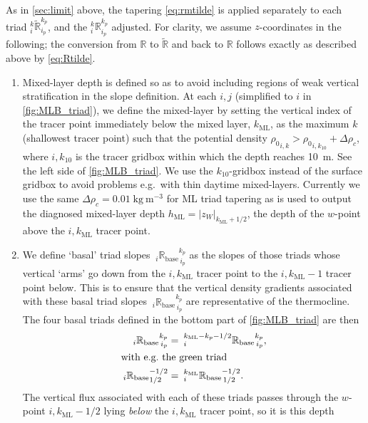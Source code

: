 \documentclass[../tex_main/NEMO_manual]{subfiles}
\begin{document}
As in \autoref{sec:limit} above, the tapering \autoref{eq:rmtilde} is applied separately to
each triad $_i^k\tilde{\mathbb{R}}_{i_p}^{k_p}$, and the $_i^k\mathbb{R}_{i_p}^{k_p}$ adjusted.
For clarity, we assume $z$-coordinates in the following;
the conversion from $\mathbb{R}$ to $\tilde{\mathbb{R}}$ and back to $\mathbb{R}$ follows exactly as
described above by \autoref{eq:Rtilde}.
\begin{enumerate}
\item
  Mixed-layer depth is defined so as to avoid including regions of weak vertical stratification in
  the slope definition.
  At each $i,j$ (simplified to $i$ in \autoref{fig:MLB_triad}),
  we define the mixed-layer by setting the vertical index of the tracer point immediately below the mixed layer,
  $k_{\mathrm{ML}}$, as the maximum $k$ (shallowest tracer point) such that
  the potential density ${\rho_0}_{i,k}>{\rho_0}_{i,k_{10}}+\Delta\rho_c$,
  where $i,k_{10}$ is the tracer gridbox within which the depth reaches 10~m.
  See the left side of \autoref{fig:MLB_triad}.
  We use the $k_{10}$-gridbox instead of the surface gridbox to avoid problems e.g.\ with thin daytime mixed-layers.
  Currently we use the same $\Delta\rho_c=0.01\;\mathrm{kg\:m^{-3}}$ for ML triad tapering as is used to
  output the diagnosed mixed-layer depth $h_{\mathrm{ML}}=|z_{W}|_{k_{\mathrm{ML}}+1/2}$,
  the depth of the $w$-point above the $i,k_{\mathrm{ML}}$ tracer point.
\item
  We define `basal' triad slopes ${\:}_i{\mathbb{R}_{\mathrm{base}}}_{\,i_p}^{k_p}$ as
  the slopes of those triads whose vertical `arms' go down from the $i,k_{\mathrm{ML}}$ tracer point to
  the $i,k_{\mathrm{ML}}-1$ tracer point below.
  This is to ensure that the vertical density gradients associated with
  these basal triad slopes ${\:}_i{\mathbb{R}_{\mathrm{base}}}_{\,i_p}^{k_p}$ are representative of the thermocline.
  The four basal triads defined in the bottom part of \autoref{fig:MLB_triad} are then
\begin{align}
  {\:}_i{\mathbb{R}_{\mathrm{base}}}_{\,i_p}^{k_p} &=
 {\:}^{k_{\mathrm{ML}}-k_p-1/2}_i{\mathbb{R}_{\mathrm{base}}}_{\,i_p}^{k_p}, \label{eq:Rbase}
\\
\intertext{with e.g.\ the green triad}
{\:}_i{\mathbb{R}_{\mathrm{base}}}_{1/2}^{-1/2}&=
{\:}^{k_{\mathrm{ML}}}_i{\mathbb{R}_{\mathrm{base}}}_{\,1/2}^{-1/2}. \notag
\end{align}
The vertical flux associated with each of these triads passes through
the $w$-point $i,k_{\mathrm{ML}}-1/2$ lying \emph{below} the $i,k_{\mathrm{ML}}$ tracer point, so it is this depth

\end{enumerate}
\end{document}
